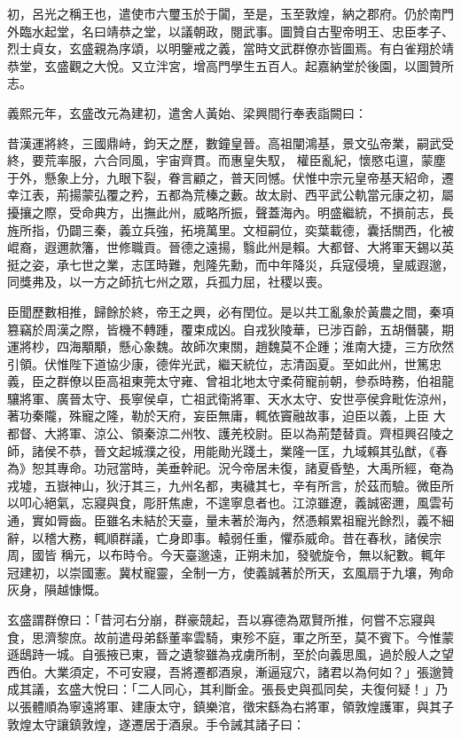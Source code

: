 \begin{pinyinscope}
 初，呂光之稱王也，遣使市六璽玉於于闐，至是，玉至敦煌，納之郡府。仍於南門外臨水起堂，名曰靖恭之堂，以議朝政，閱武事。圖贊自古聖帝明王、忠臣孝子、烈士貞女，玄盛親為序頌，以明鑒戒之義，當時文武群僚亦皆圖焉。有白雀翔於靖恭堂，玄盛觀之大悅。又立泮宮，增高門學生五百人。起嘉納堂於後園，以圖贊所志。



 義熙元年，玄盛改元為建初，遣舍人黃始、梁興間行奉表詣闕曰：



 昔漢運將終，三國鼎峙，鈞天之歷，數鐘皇晉。高祖闡鴻基，景文弘帝業，嗣武受終，要荒率服，六合同風，宇宙齊貫。而惠皇失馭，
 權臣亂紀，懷愍屯邅，蒙塵于外，懸象上分，九眼下裂，眷言顧之，普天同憾。伏惟中宗元皇帝基天紹命，遷幸江表，荊揚蒙弘覆之矜，五都為荒榛之藪。故太尉、西平武公軌當元康之初，屬擾攘之際，受命典方，出撫此州，威略所振，聲蓋海內。明盛繼統，不損前志，長旌所指，仍闢三秦，義立兵強，拓境萬里。文桓嗣位，奕葉載德，囊括關西，化被崐裔，遐邇款籓，世修職貢。晉德之遠揚，翳此州是賴。大都督、大將軍天錫以英挺之姿，承七世之業，志匡時難，剋隆先勳，而中年降災，兵寇侵境，皇威遐邈，同獎弗及，以一方之師抗七州之眾，兵孤力屈，社稷以喪。



 臣聞歷數相推，歸餘於終，帝王之興，必有閏位。是以共工亂象於黃農之間，秦項篡竊於周漢之際，皆機不轉踵，覆束成凶。自戎狄陵華，已涉百齡，五胡僭襲，期運將杪，四海顒顒，懸心象魏。故師次東關，趙魏莫不企踵；淮南大捷，三方欣然引領。伏惟陛下道協少康，德侔光武，繼天統位，志清函夏。至如此州，世篤忠義，臣之群僚以臣高祖東莞太守雍、曾祖北地太守柔荷寵前朝，參忝時務，伯祖龍驤將軍、廣晉太守、長寧侯卓，亡祖武衛將軍、天水太守、安世亭侯弇毗佐涼州，著功秦隴，殊寵之隆，勒於天府，妄臣無庸，輒依竇融故事，迫臣以義，上臣
 大都督、大將軍、涼公、領秦涼二州牧、護羌校尉。臣以為荊楚替貢。齊桓興召陵之師，諸侯不恭，晉文起城濮之役，用能勛光踐土，業隆一匡，九域賴其弘猷，《春為》恕其專命。功冠當時，美垂幹祀。況今帝居未復，諸夏昏墊，大禹所經，奄為戎墟，五嶽神山，狄汙其三，九州名都，夷穢其七，辛有所言，於茲而驗。微臣所以叩心絕氣，忘寢與食，彫肝焦慮，不遑寧息者也。江涼雖遼，義誠密邇，風雲茍通，實如脣齒。臣雖名未結於天臺，量未著於海內，然憑賴累祖寵光餘烈，義不細辭，以稽大務，輒順群議，亡身即事。轅弱任重，懼忝威命。昔在春秋，諸侯宗周，國皆
 稱元，以布時令。今天臺邈遠，正朔未加，發號旋令，無以紀數。輒年冠建初，以崇國憲。冀杖寵靈，全制一方，使義誠著於所天，玄風扇于九壤，殉命灰身，隕越慷慨。



 玄盛謂群僚曰：「昔河右分崩，群豪競起，吾以寡德為眾賢所推，何嘗不忘寢與食，思濟黎庶。故前遣母弟繇董率雲騎，東殄不庭，軍之所至，莫不賓下。今惟蒙遜鴟跱一城。自張掖已東，晉之遺黎雖為戎虜所制，至於向義思風，過於殷人之望西伯。大業須定，不可安寢，吾將遷都酒泉，漸逼寇穴，諸君以為何如？」張邈贊成其議，玄盛大悅曰：「二人同心，其利斷金。張長史與孤同矣，夫復何疑！」乃
 以張體順為寧遠將軍、建康太守，鎮樂涫，徵宋繇為右將軍，領敦煌護軍，與其子敦煌太守讓鎮敦煌，遂遷居于酒泉。手令誡其諸子曰：




\end{pinyinscope}
